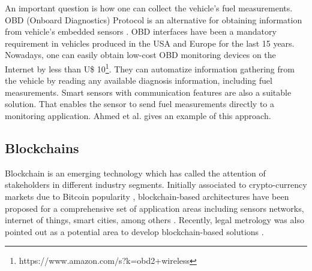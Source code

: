 \documentclass[sigplan]{acmart}
\begin{document}
An important question is how one can collect the vehicle's fuel measurements.
OBD (Onboard Diagnostics) Protocol is an alternative for obtaining information from vehicle's embedded sensors \cite{Andria2016}.
OBD interfaces have been a mandatory requirement in vehicles produced in the USA and Europe for the last 15 years.
Nowadays, one can easily obtain low-cost OBD monitoring devices on the Internet by less than U\$ 10\footnote{https://www.amazon.com/s?k=obd2+wireless}.
They can automatize information gathering from the vehicle by reading any available diagnosis information, including fuel measurements.
Smart sensors with communication features are also a suitable solution.
That enables the sensor to send fuel measurements directly to a monitoring application.
Ahmed et al. \cite{Ahmed2017} gives an example of this approach.

\subsection{Blockchains}
Blockchain is an emerging technology which has called the attention of stakeholders in different industry segments. 
Initially associated to crypto-currency markets due to Bitcoin popularity \cite{Zheng2017}, blockchain-based architectures have been proposed for a comprehensive set of application areas including sensors networks, internet of things, smart cities, among others \cite{Zheng2017,Androulaki2018}.
Recently, legal metrology was also pointed out as a potential area to develop blockchain-based solutions \cite{Peters2018,MeloJr.2019}.
\end{document}
